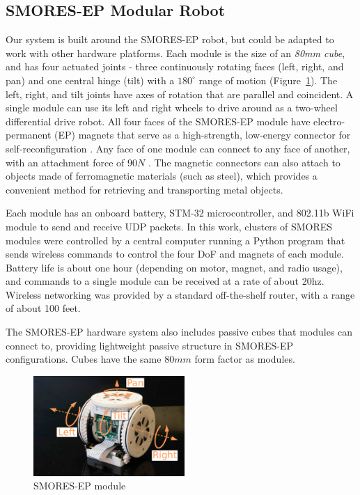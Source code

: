 \documentclass[conference]{IEEEtran}
\begin{document}
\subsection{SMORES-EP Modular Robot} \label{sec:smores}
%
Our system is built around the SMORES-EP robot, but could be adapted to
work with other hardware platforms. Each module is the size of an \textit{80mm cube}, and has four actuated joints - three continuously rotating faces (left, right, and
pan)  and one central hinge (tilt) with a \(180^\circ\) range of motion
(Figure~\ref{fig:smores-module}). The left, right, and tilt joints have
 axes of rotation that are parallel and coincident. A single module can use its
left and right wheels to drive around as a two-wheel differential drive robot.
All four faces of the SMORES-EP module have electro-permanent (EP) magnets
that serve as a high-strength, low-energy connector for self-reconfiguration
\cite{tosun2016design}.  Any face of one module can connect to any face of
another, with an attachment force of $90N$ \cite{tosun2016design}. The magnetic connectors can also attach to objects made of ferromagnetic materials (such as steel), which provides a convenient method for retrieving and transporting metal objects.

Each module has an onboard battery, STM-32 microcontroller, and 802.11b WiFi
module to send and receive UDP packets.  In this work, clusters of SMORES
modules were controlled by a central computer running a Python program that
sends wireless commands to control the four DoF and magnets of each module.
Battery life is about one hour (depending on motor, magnet, and radio usage),
and commands to a single module can be received at a rate of about 20hz.
Wireless networking was provided by a standard off-the-shelf  router, with a
range of about 100 feet.

The SMORES-EP hardware system also includes passive cubes that modules can connect to, providing lightweight passive structure in SMORES-EP configurations.  Cubes have the same $80mm$ form factor as modules.
%
\begin{figure}   
\begin{center}
\includegraphics[height=1.5in]{images/smores_dof.pdf}
\end{center}
\caption{SMORES-EP module}
\label{fig:smores-module}
\vspace{-2em}
\end{figure}
%
\end{document}
